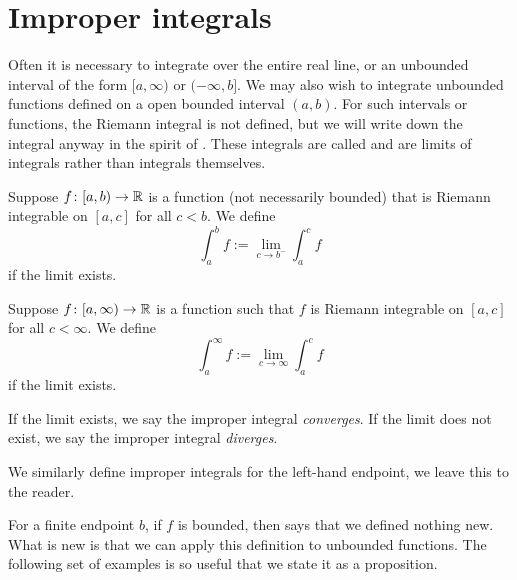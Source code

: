 
\sectionnewpage
\section{Improper integrals}
\label{sec:impropriemann}


Often it is necessary to integrate over the
entire real line, or an unbounded interval of the form $[a,\infty)$ or
$(-\infty,b]$.  We may also wish to integrate unbounded functions
defined on a open bounded interval $(a,b)$.
For such intervals or functions, the Riemann integral is not defined,
but we will write down
the integral anyway in the spirit of .
These integrals are called \emph{}
and are limits
of integrals rather than integrals themselves.

\begin{defn}
Suppose $f \colon [a,b) \to {\mathbb{R}}$ is a function (not necessarily bounded)
that is Riemann integrable on $[a,c]$ for all $c < b$.  We define
\begin{equation*}
\int_a^b f := \lim_{c \to b^-} \int_a^{c} f
\end{equation*}
if the limit exists.

Suppose $f \colon [a,\infty) \to {\mathbb{R}}$ is a function such that
$f$ is Riemann integrable on $[a,c]$ for all $c < \infty$.  
We define
\begin{equation*}
\int_a^\infty f := \lim_{c \to \infty} \int_a^c f
\end{equation*}
if the limit exists.

If the limit exists, we say the improper integral
\emph{converges}.
If the limit does not exist, we say the improper integral
\emph{diverges}.

We similarly define improper integrals for the left-hand endpoint, we leave
this to the reader.
\end{defn}

For a finite endpoint $b$, if $f$ is bounded,
then
 says that we defined nothing new.  What is new is that
we can apply this definition to unbounded functions.
The following set of examples is
so useful that we state it as a proposition.

